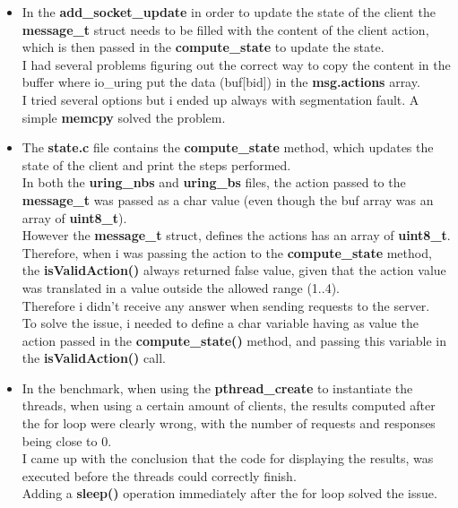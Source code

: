 \documentclass[10pt, oneside,english]{article}   	%
\begin{document}
\begin{itemize}
    \item In the \textbf{add\_socket\_update} in order to update the state of the client the \textbf{message\_t} struct needs to be filled with the content of the client action, which is then passed in the \textbf{compute\_state} to update the state. \\I had several problems figuring out the correct way to copy the content in the buffer where io\_uring put the data (buf[bid]) in the \textbf{msg.actions} array.\\ I tried several options but i ended up always with segmentation fault. A simple \textbf{memcpy} solved the problem.
    \item The \textbf{state.c} file contains the \textbf{compute\_state} method, which updates the state of the client and print the steps performed.\\ In both the \textbf{uring\_nbs} and \textbf{uring\_bs} files, the action passed to the \textbf{message\_t} was passed as a char value (even though the buf array was an array of \textbf{uint8\_t}). \\However the \textbf{message\_t} struct, defines the actions has an array of \textbf{uint8\_t}.\\ Therefore, when i was passing the action to the       \textbf{compute\_state} method, the \textbf{isValidAction()} always returned false value, given that the action value was translated in a value outside the allowed range (1..4).\\ Therefore i didn't receive any answer when sending requests to the server. \\To solve the issue, i needed to define a char variable having as value the action passed in the \textbf{compute\_state()} method, and passing this variable in the \textbf{isValidAction()} call.
    \item In the benchmark, when using the \textbf{pthread\_create} to instantiate the threads, when using a certain amount of clients, the results computed after the for loop were clearly wrong, with the number of requests and responses being close to 0. \\ I came up with the conclusion that the code for displaying the results, was executed before the threads could correctly finish. \\ Adding a \textbf{sleep()} operation immediately after the for loop solved the issue.
    
\end{itemize}
\end{document}
